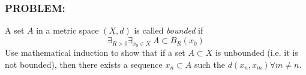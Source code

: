 \documentclass[]{article}
\newcommand{\Problem}{\subsubsection*{\textbf{PROBLEM:}}}
\newcommand{\R}{\mathbb{R}}
\newcommand{\st}{\ : \ }
\newtheorem{definition}{Definition}
\begin{document}

\newpage
\section{}
\Problem
A set $A$ in a metric space $(X,d)$ is called \emph{bounded} if \[
    \exists_{R>0} \exists_{x_0\in X} \ A \subset B_R(x_0)
\]
Use mathematical induction to show that if a set $A \subset X$ is unbounded (i.e. it is not bounded), then there exists a sequence ${x_n} \subset A$ such the $d(x_n,x_m) \forall m \neq n$.

\end{document}
